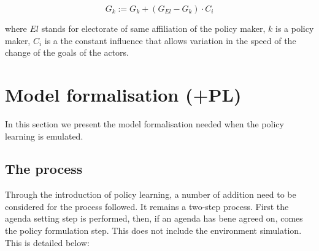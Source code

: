 \documentclass[11pt]{article}
\begin{document}
\begin{equation}
G_{k} := G_{k} + \left(G_{El} - G_{k} \right) \cdot C_{i}
\end{equation}

where $El$ stands for electorate of same affiliation of the policy maker, $k$ is a policy maker, $C_i$ is a the constant influence that allows variation in the speed of the change of the goals of the actors.



\section{Model formalisation (+PL)}

In this section we present the model formalisation needed when the policy learning is emulated.

\subsection{The process}

Through the introduction of policy learning, a number of addition need to be considered for the process followed. It remains a two-step process. First the agenda setting step is performed, then, if an agenda has bene agreed on, comes the policy formulation step. This does not include the environment simulation. This is detailed below:
\end{document}
